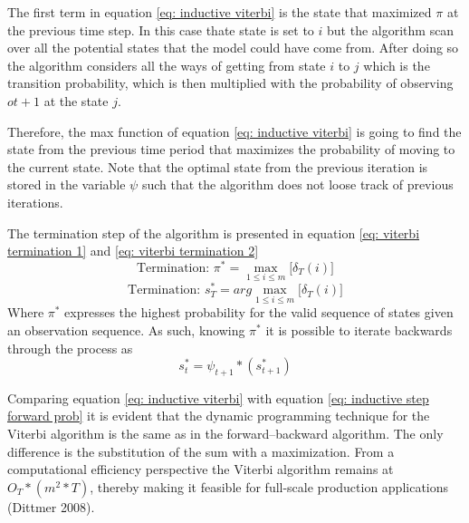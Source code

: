 The first term in equation \ref{eq: inductive viterbi} is the state that maximized $\pi$ at the previous time step. In this case thate state is set to $i$ but the algorithm scan over all the potential states that the model could have come from. After doing so the algorithm considers all the ways of getting from state  $i$ to $j$ which is the transition probability, which is then multiplied with the probability of observing $ot+1$ at the state $j$. 

Therefore, the max function of equation \ref{eq: inductive viterbi} is going to find the state from the previous time period that maximizes the probability of moving to the current state. Note that the optimal state from the previous iteration is stored in the variable $\psi$ such that the algorithm does not loose track of previous iterations. 

The termination step of the algorithm is presented in equation \ref{eq: viterbi termination 1} and \ref{eq: viterbi termination 2}
\begin{equation}
    \text{Termination: } \pi^* = \max_{1\leq i\leq m}\Big[\delta_T(i)\Big] 
    \label{eq: viterbi termination 1}
\end{equation}
 \begin{equation}
     \text{Termination: } s_T^*= arg\max_{1\leq i\leq m}\Big[\delta_T(i)\Big]
     \label{eq: viterbi termination 2}
 \end{equation}
Where $\pi^*$ expresses the highest probability for the valid sequence of states given an observation sequence. As such, knowing $\pi^*$ it is possible to iterate backwards through the process as
\begin{equation}
    s_t^* = \psi_{t+1}*(s_{t+1}^*)
\end{equation}

Comparing equation \ref{eq: inductive viterbi} with equation \ref{eq: inductive step forward prob} it is evident that the dynamic programming technique for the Viterbi algorithm is the same as in the forward–backward
algorithm. The only difference is the substitution of the sum with a maximization. From a computational efficiency perspective the Viterbi algorithm remains at $O_T*(m^2*T)$, thereby making it feasible for full-scale production applications (Dittmer 2008).

